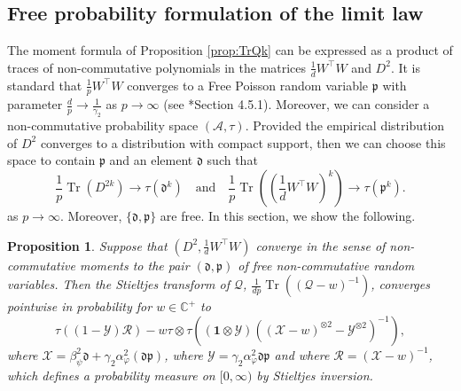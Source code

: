 \documentclass[letterpaper, 10pt, dvipsnames]{article}
\numberwithin{equation}{section}
\DeclareMathOperator{\Tr}{Tr}
\newcommand{\C}{\mathbb{C}}
\newcommand{\Q}{\mathcal{Q}}
\renewcommand{\phi}{\varphi}
\newtheorem{prop}[ccounter]{Proposition}
\theoremstyle{definition}
\begin{document}
\subsection{Free probability formulation of the limit law}\label{subsec:freeproba}
The moment formula of Proposition \ref{prop:TrQk} can be expressed as a product of traces of non-commutative polynomials in the matrices $\frac{1}{d}W^{\top}W$ and $D^2$. It is standard that $\frac{1}{p}W^{\top}W$ converges to a Free Poisson random variable $\mathfrak{p}$ with parameter $\frac{d}{p} \to \frac{1}{\gamma_2}$ as $p \to \infty$ (see \cite{Mingo2017}*{Section 4.5.1}).  Moreover, we can consider a non-commutative probability space $(\mathcal{A}, \tau)$.  Provided the empirical distribution of $D^2$ converges to a distribution with compact support, then we can choose this space to contain $\mathfrak{p}$ and an element $\mathfrak{d}$ such that 
\[
\frac{1}{p}\Tr(D^{2k}) \to \tau(\mathfrak{d}^k)
\quad \text{and}\quad 
\frac{1}{p}\Tr\left( \left(\frac{1}{d}W^{\top}W \right)^{k} \right) \to \tau(\mathfrak{p}^k).
\]
as $p \to \infty$.  Moreover, $\{\mathfrak{d}, \mathfrak{p}\}$ are free.  In this section, we show the following.
\begin{prop}\label{prop:stieltjes}
  Suppose that $(D^2, \tfrac{1}{d}W^{\top}W)$ converge in the sense of non-commutative moments to the pair $(\mathfrak{d}, \mathfrak{p})$ of free non-commutative random variables.  Then the Stieltjes transform of $\Q$, $\frac{1}{dp}\Tr( (\Q-w)^{-1})$, converges pointwise in probability for $w \in \C^+$ to 
  \[
    \tau\left(
      (1-\mathcal{Y})\mathcal{R}
    \right)
    -w
    \tau\otimes\tau \left(
    (\mathbf{1} \otimes \mathcal{Y})
    ( (\mathcal{X}-w)^{\otimes 2} - \mathcal{Y}^{\otimes 2})^{-1}
    \right),
  \]
  where $\mathcal{X} = \beta_\psi^2 \mathfrak{d} + {\gamma_2\alpha_\phi^2}\left( \mathfrak{d}\mathfrak{p} \right)$, where $\mathcal{Y} = \gamma_2\alpha_\phi^2 \mathfrak{d}\mathfrak{p}$ and where $\mathcal{R} = (\mathcal{X}-w)^{-1}$, which defines a probability measure on $[0,\infty)$ by Stieltjes inversion.
\end{prop}
\end{document}

